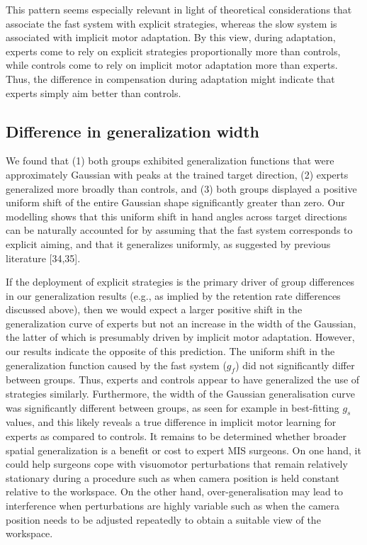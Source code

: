 \documentclass[jou, 11pt, longtable, floatsintext, notab]{apa6}
\begin{document}
This pattern seems especially relevant in light of
theoretical considerations that associate the fast system
with explicit strategies, whereas the slow system is
associated with implicit motor adaptation. By this view,
during adaptation, experts come to rely on explicit
strategies proportionally more than controls, while controls
come to rely on implicit motor adaptation more than experts.
Thus, the difference in compensation during adaptation might
indicate that experts simply aim better than controls.

\subsection{Difference in generalization width}
We found that (1) both groups exhibited generalization
functions that were approximately Gaussian with peaks at the
trained target direction, (2) experts generalized more
broadly than controls, and (3) both groups displayed a
positive uniform shift of the entire Gaussian shape
significantly greater than zero. Our modelling shows that
this uniform shift in hand angles across target directions
can be naturally accounted for by assuming that the fast
system corresponds to explicit aiming, and that it
generalizes uniformly, as suggested by previous literature
[34,35].

If the deployment of explicit strategies is the primary
driver of group differences in our generalization results
(e.g., as implied by the retention rate differences
discussed above), then we would expect a larger positive
shift in the generalization curve of experts but not an
increase in the width of the Gaussian, the latter of which
is presumably driven by implicit motor adaptation. However,
our results indicate the opposite of this prediction. The
uniform shift in the generalization function caused by the
fast system ($g_f$) did not significantly differ between
groups. Thus, experts and controls appear to have
generalized the use of strategies similarly. Furthermore,
the width of the Gaussian generalisation curve was
significantly different between groups, as seen for example
in best-fitting $g_s$ values, and this likely reveals a true
difference in implicit motor learning for experts as
compared to controls. It remains to be determined whether
broader spatial generalization is a benefit or cost to
expert MIS surgeons. On one hand, it could help surgeons
cope with visuomotor perturbations that remain relatively
stationary during a procedure such as when camera position
is held constant relative to the workspace. On the other
hand, over-generalisation may lead to interference when
perturbations are highly variable such as when the camera
position needs to be adjusted repeatedly to obtain a
suitable view of the workspace.
\end{document}
